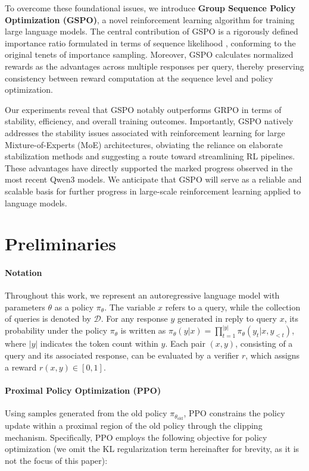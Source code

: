 To overcome these foundational issues, we introduce \textbf{Group Sequence Policy Optimization (GSPO)}, a novel reinforcement learning algorithm for training large language models. The central contribution of GSPO is a rigorously defined importance ratio formulated in terms of sequence likelihood \citep{click}, conforming to the original tenets of importance sampling. Moreover, GSPO calculates normalized rewards as the advantages across multiple responses per query, thereby preserving consistency between reward computation at the sequence level and policy optimization.

Our experiments reveal that GSPO notably outperforms GRPO in terms of stability, efficiency, and overall training outcomes. Importantly, GSPO natively addresses the stability issues associated with reinforcement learning for large Mixture-of-Experts (MoE) architectures, obviating the reliance on elaborate stabilization methods and suggesting a route toward streamlining RL pipelines. These advantages have directly supported the marked progress observed in the most recent Qwen3 models. We anticipate that GSPO will serve as a reliable and scalable basis for further progress in large-scale reinforcement learning applied to language models.

\section{Preliminaries}

\paragraph{Notation}
Throughout this work, we represent an autoregressive language model with parameters $\theta$ as a policy $\pi_\theta$.
The variable $x$ refers to a query, while the collection of queries is denoted by $\mathcal{D}$. For any response $y$ generated in reply to query $x$, its probability under the policy $\pi_\theta$ is written as $\pi_\theta (y | x)=\prod_{t=1}^{|y|} \pi_\theta (y_t | x, y_{<t} )$, where $|y|$ indicates the token count within $y$. Each pair $(x, y)$, consisting of a query and its associated response, can be evaluated by a verifier $r$, which assigns a reward $r(x, y) \in [ 0, 1 ]$.

\paragraph{Proximal Policy Optimization (PPO)} Using samples generated from the old policy $\pi_{\theta_\text{old}}$, PPO \citep{ppo} constrains the policy update within a proximal region of the old policy through the clipping mechanism. Specifically, PPO employs the following objective for policy optimization (we omit the KL regularization term hereinafter for brevity, as it is not the focus of this paper):

